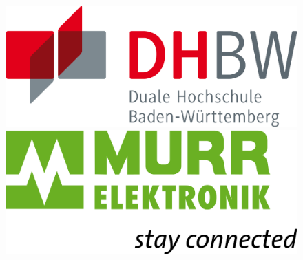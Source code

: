 
%
\begin{titlepage}
    \begin{center}
        \begin{figure}[htbp]
            \begin{minipage}{0.4\textwidth}
             \flushleft
              \includegraphics[width=0.25\textheight]{Figures/DHBW-Logo.svg.png}
            \end{minipage}\hfill
            \begin{minipage}{0.4\textwidth}
             \flushright
              \includegraphics[width=0.25\textheight]{Figures/Murrelektronik.svg.png}
            \end{minipage}
      \end{figure}


\end{center}
\end{titlepage}
